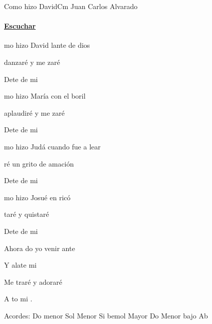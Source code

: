 \documentclass[12pt, spanish]{book}
\newcommand{\NotCCLIed}{\relax}
\begin{document}
    \begin{song}{Como hizo David}{Cm}
    {} %
    {Juan Carlos Alvarado}
    {} %
    {} %
        \ifChordBk
        \paragraph{\mbox{}\hfill\protect\href{https://open.spotify.com/intl-es/track/75IhuMXXHxnSCnaWKwPjSQ}{Escuchar}\mbox{}\hfill}
        \fi

        \begin{SBOpGroup}
            mo hizo David lante de dios

             danzaré y me zaré

            Dete de mi 
        \end{SBOpGroup}
        \vskip 20pt
        \begin{SBOpGroup}
            mo hizo María con el boril

             aplaudiré y me zaré

            Dete de mi 
        \end{SBOpGroup}
        \vskip 20pt
        \begin{SBOpGroup}
            mo hizo Judá cuando fue a lear

            ré un grito de amación

            Dete de mi 
        \end{SBOpGroup}
        \vskip 20pt
        \begin{SBOpGroup}
            mo hizo Josué en ricó

            taré y quistaré

            Dete de mi 
        \end{SBOpGroup}
        \vskip 20pt
        \begin{SBOpGroup}
            Ahora do yo venir ante 

            Y alate  mi 

            Me traré y adoraré

            A to  mi .
        \end{SBOpGroup}

        \ifChordBk
        \begin{SBOpGroup}
            Acordes:\break
            \upchord{\Cm}Do menor \hfill
            \upchord{\Gm}\qquad Sol Menor \hfill\null\break
            \upchord{\Bflat}\qquad Si bemol Mayor \hfill\null\break
            \upchord{\CmAflat}Do Menor bajo Ab \hfill\null\break
        \end{SBOpGroup}
        \fi
    \end{song}
\end{document}
